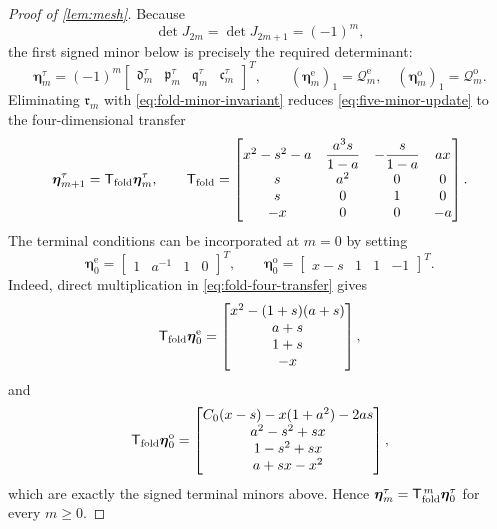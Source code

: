 \documentclass[review,hidelinks,onefignum,onetabnum]{siamart251216}
\begin{document}
\begin{proof}[Proof of \cref{lem:mesh}]
Because
\[
 \det J_{2m}=\det J_{2m+1}=(-1)^m,
\]
the first signed minor below is precisely the required determinant:
\[
 \boldsymbol\eta_m^\tau
 =
 (-1)^m
 \begin{bmatrix}
 \mathfrak d_m^\tau&\mathfrak p_m^\tau&
 \mathfrak q_m^\tau&\mathfrak c_m^\tau
 \end{bmatrix}^{T},
 \qquad
 (\boldsymbol\eta_m^{\mathrm e})_1=\mathcal Q_m^{\mathrm e},
 \quad
 (\boldsymbol\eta_m^{\mathrm o})_1=\mathcal Q_m^{\mathrm o}.
\]
Eliminating \(\mathfrak r_m\) with \eqref{eq:fold-minor-invariant} reduces
\eqref{eq:five-minor-update} to the four-dimensional transfer
\begin{equation}\label{eq:fold-four-transfer}
 \boldsymbol\eta_{m+1}^\tau
 =\mathsf T_{\rm fold}\boldsymbol\eta_m^\tau,
 \qquad
 \mathsf T_{\rm fold}=
 \begin{bmatrix}
 x^2-s^2-a&\dfrac{a^3s}{1-a}&-\dfrac{s}{1-a}&ax\\[2mm]
 s&a^2&0&0\\
 s&0&1&0\\
 -x&0&0&-a
 \end{bmatrix}.
\end{equation}
The terminal conditions can be incorporated at \(m=0\) by setting
\begin{equation}\label{eq:fold-transfer-initial}
 \boldsymbol\eta_0^{\mathrm e}
 =\begin{bmatrix}1&a^{-1}&1&0\end{bmatrix}^{T},
 \qquad
 \boldsymbol\eta_0^{\mathrm o}
 =\begin{bmatrix}x-s&1&1&-1\end{bmatrix}^{T}.
\end{equation}
Indeed, direct multiplication in \eqref{eq:fold-four-transfer} gives
\[
 \mathsf T_{\rm fold}\boldsymbol\eta_0^{\mathrm e}
 =
 \begin{bmatrix}
 x^2-(1+s)(a+s)\\ a+s\\1+s\\-x
 \end{bmatrix},
\]
and
\[
 \mathsf T_{\rm fold}\boldsymbol\eta_0^{\mathrm o}
 =
 \begin{bmatrix}
 C_0(x-s)-x(1+a^2)-2as\\
 a^2-s^2+sx\\
 1-s^2+sx\\
 a+sx-x^2
 \end{bmatrix},
\]
which are exactly the signed terminal minors above.  Hence
\(\boldsymbol\eta_m^\tau
=\mathsf T_{\rm fold}^{\,m}\boldsymbol\eta_0^\tau\) for every
\(m\geq0\).


\end{proof}
\end{document}
